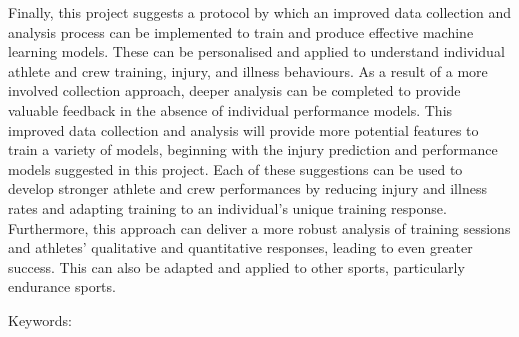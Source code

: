 Finally, this project suggests a protocol by which an improved data collection and analysis process can be implemented to train and produce effective machine learning models. These can be personalised and applied to understand individual athlete and crew training, injury, and illness behaviours. As a result of a more involved collection approach, deeper analysis can be completed to provide valuable feedback in the absence of individual performance models. This improved data collection and analysis will provide more potential features to train a variety of models, beginning with  the injury prediction and performance models suggested in this project. Each of these suggestions can be used to develop stronger athlete and crew performances by reducing injury and illness rates and adapting training to an individual's unique training response. Furthermore, this approach can deliver a more robust analysis of training sessions and athletes' qualitative and quantitative responses, leading to even greater success. This can also be adapted and applied to other sports, particularly endurance sports.

\vspace{1cm}
Keywords: \keywords 